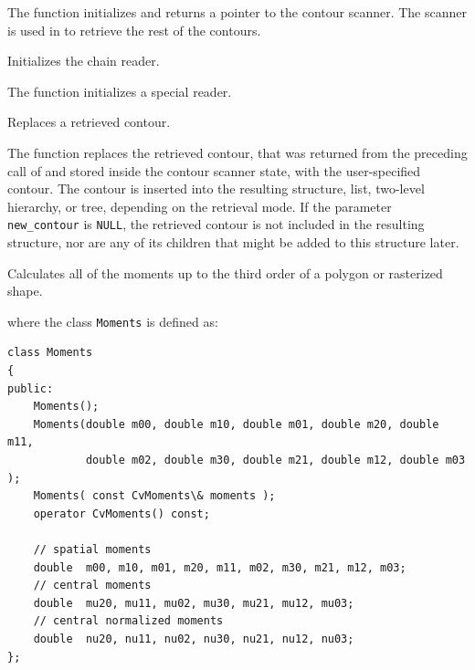 The function initializes and returns a pointer to the contour scanner. The scanner is used in  to retrieve the rest of the contours.

Initializes the chain reader.


The function initializes a special reader.

Replaces a retrieved contour.


\begin{description}
\end{description}

The function replaces the retrieved
contour, that was returned from the preceding call of
 and stored inside the contour scanner
state, with the user-specified contour. The contour is inserted
into the resulting structure, list, two-level hierarchy, or tree,
depending on the retrieval mode. If the parameter \texttt{new\_contour}
is \texttt{NULL}, the retrieved contour is not included in the
resulting structure, nor are any of its children that might be added
to this structure later.

\fi

\fi


\ifCpp

Calculates all of the moments up to the third order of a polygon or rasterized shape.


where the class \texttt{Moments} is defined as:
\begin{lstlisting}
class Moments
{
public:
    Moments();
    Moments(double m00, double m10, double m01, double m20, double m11,
            double m02, double m30, double m21, double m12, double m03 );
    Moments( const CvMoments\& moments );
    operator CvMoments() const;
    
    // spatial moments
    double  m00, m10, m01, m20, m11, m02, m30, m21, m12, m03;
    // central moments
    double  mu20, mu11, mu02, mu30, mu21, mu12, mu03;
    // central normalized moments
    double  nu20, nu11, nu02, nu30, nu21, nu12, nu03;
};
\end{lstlisting}

